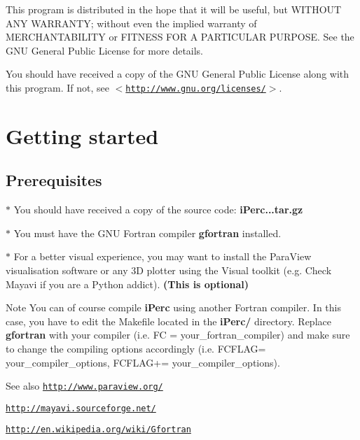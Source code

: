 \par
 \-This program is distributed in the hope that it will be useful, but \-W\-I\-T\-H\-O\-U\-T \-A\-N\-Y \-W\-A\-R\-R\-A\-N\-T\-Y; without even the implied warranty of \-M\-E\-R\-C\-H\-A\-N\-T\-A\-B\-I\-L\-I\-T\-Y or \-F\-I\-T\-N\-E\-S\-S \-F\-O\-R \-A \-P\-A\-R\-T\-I\-C\-U\-L\-A\-R \-P\-U\-R\-P\-O\-S\-E. \-See the \-G\-N\-U \-General \-Public \-License for more details.

\par
 \-You should have received a copy of the \-G\-N\-U \-General \-Public \-License along with this program. \-If not, see $<$\href{http://www.gnu.org/licenses/}{\tt http\-://www.\-gnu.\-org/licenses/}$>$.\hypertarget{index_getting_started_sec}{}\section{\-Getting started}\label{index_getting_started_sec}
\hypertarget{index_prerequisites_sec}{}\subsection{\-Prerequisites}\label{index_prerequisites_sec}
$\ast$ \-You should have received a copy of the source code\-: {\bfseries i\-Perc...\-tar.\-gz} \par
 \par
 $\ast$ \-You must have the \-G\-N\-U \-Fortran compiler {\bfseries gfortran} installed. \par
 \par
 $\ast$ \-For a better visual experience, you may want to install the \-Para\-View visualisation software or any 3\-D plotter using the \-Visual toolkit (e.\-g. \-Check \-Mayavi if you are a \-Python addict). {\bfseries (\-This is optional)} \begin{DoxyNote}{\-Note}
\-You can of course compile {\bfseries i\-Perc} using another \-Fortran compiler. \-In this case, you have to edit the \-Makefile located in the {\bfseries i\-Perc/} directory. \-Replace {\bfseries gfortran} with your compiler (i.\-e. \-F\-C = your\-\_\-fortran\-\_\-compiler) and make sure to change the compiling options accordingly (i.\-e. \-F\-C\-F\-L\-A\-G= your\-\_\-compiler\-\_\-options, \-F\-C\-F\-L\-A\-G+= your\-\_\-compiler\-\_\-options). 
\end{DoxyNote}
\begin{DoxySeeAlso}{\-See also}
\href{http://www.paraview.org/}{\tt http\-://www.\-paraview.\-org/} 

\href{http://mayavi.sourceforge.net/}{\tt http\-://mayavi.\-sourceforge.\-net/} 

\href{http://en.wikipedia.org/wiki/Gfortran}{\tt http\-://en.\-wikipedia.\-org/wiki/\-Gfortran}
\end{DoxySeeAlso}
